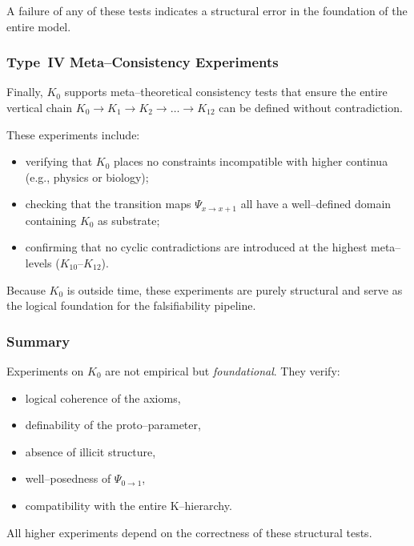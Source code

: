A failure of any of these tests indicates a structural error in the
foundation of the entire model.


\subsubsection{Type~IV Meta–Consistency Experiments}

Finally, $K_0$ supports meta–theoretical consistency tests that ensure the
entire vertical chain $K_0\to K_1\to K_2\to \dots \to K_{12}$ can be defined
without contradiction.

These experiments include:
\begin{itemize}
    \item verifying that $K_0$ places no constraints incompatible with higher
          continua (e.g., physics or biology);
    \item checking that the transition maps $\Psi_{x\to x+1}$ all have a
          well–defined domain containing $K_0$ as substrate;
    \item confirming that no cyclic contradictions are introduced at the
          highest meta–levels ($K_{10}$–$K_{12}$).
\end{itemize}

Because $K_0$ is outside time, these experiments are purely structural and
serve as the logical foundation for the falsifiability pipeline.


\subsubsection{Summary}

Experiments on $K_0$ are not empirical but \emph{foundational}.
They verify:

\begin{itemize}
    \item logical coherence of the axioms,
    \item definability of the proto–parameter,
    \item absence of illicit structure,
    \item well–posedness of $\Psi_{0\to1}$,
    \item compatibility with the entire K–hierarchy.
\end{itemize}

All higher experiments depend on the correctness of these structural tests.

